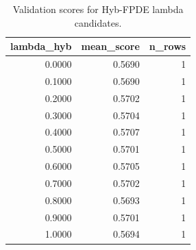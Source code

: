 \begin{table}[t]
\caption{Validation scores for Hyb-FPDE lambda candidates.}
\label{tab:lambda_distribution_computed}
\centering
\begin{tabular}{rrr}
\toprule
lambda\_hyb & mean\_score & n\_rows \\
\midrule
0.0000 & 0.5690 & 1 \\
0.1000 & 0.5690 & 1 \\
0.2000 & 0.5702 & 1 \\
0.3000 & 0.5704 & 1 \\
0.4000 & 0.5707 & 1 \\
0.5000 & 0.5701 & 1 \\
0.6000 & 0.5705 & 1 \\
0.7000 & 0.5702 & 1 \\
0.8000 & 0.5693 & 1 \\
0.9000 & 0.5701 & 1 \\
1.0000 & 0.5694 & 1 \\
\bottomrule
\end{tabular}

\end{table}
